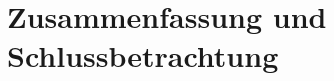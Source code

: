 \documentclass[11pt,english,ngerman, headsepline]{scrreprt}
\begin{document}
\chapter{Zusammenfassung und Schlussbetrachtung}

 \cite{dsmUhrenArtikel}
 
\end{document}

